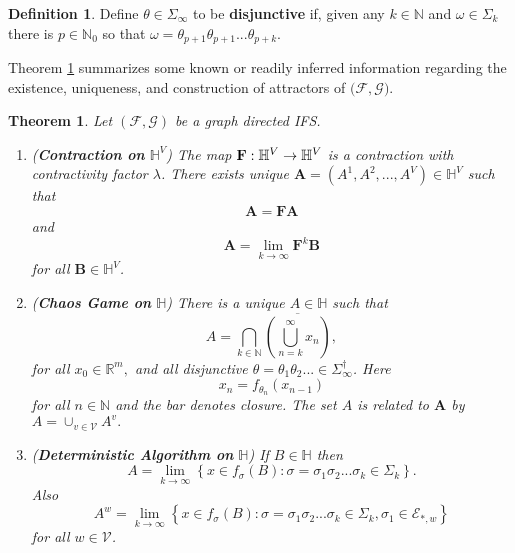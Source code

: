 \documentclass{amsproc}
\newtheorem{theorem}{Theorem}
\theoremstyle{plain}
\theoremstyle{definition}
\newtheorem{definition}{Definition}
\numberwithin{equation}{section}
\begin{document}
\begin{definition}
Define $\theta\in\Sigma_{\infty}$ to be \textbf{disjunctive} if, given any $%
k\in\mathbb{N}$ and $\omega\in\Sigma_{k}$ there is $p\in\mathbb{N}_{0}$ so
that $\omega=\theta_{p+1}\theta_{p+1}...\theta_{p+k}$.
\end{definition}

Theorem \ref{thm:one} summarizes some known or readily inferred information
regarding the existence, uniqueness, and construction of attractors of $(%
\mathcal{F},\mathcal{G)}$.

\begin{theorem}
\label{thm:one} Let $\left( \mathcal{F},\mathcal{G}\right) $ be a graph
directed IFS.

\begin{enumerate}
\item (\textbf{Contraction on} $\mathbb{H}^{V}$) The map $\mathbf{F}:\mathbb{%
H}^{V}\rightarrow\mathbb{H}^{V}$ is a contraction with contractivity factor $%
\lambda$. There exists unique $\mathbf{A}=(A^{1},A^{2},...,A^{V})\in\mathbb{H%
}^{V}$ such that 
\begin{equation*}
\mathbf{A=FA}
\end{equation*}
and 
\begin{equation*}
\mathbf{A=}\lim_{k\rightarrow\infty}\mathbf{F}^{k}\mathbf{B}
\end{equation*}
for all $\mathbf{B}\in\mathbb{H}^{V}$.

\item (\textbf{Chaos Game on }$\mathbb{H}$) There is a unique $A\in\mathbb{H}$
such that
\[
A=\bigcap\limits_{k\in\mathbb{N}}\overline{(%
{\displaystyle\bigcup\limits_{n=k}^{\infty}}
x_{n})},
\]
for all $x_{0}\in\mathbb{R}^{m},$ and all disjunctive $\theta=\theta_{1}%
\theta_{2}...\in\Sigma_{\infty}^{\dag}$. Here
\[
x_{n}=f_{\theta_{n}}(x_{n-1})
\]
for all $n\in\mathbb{N}$ and the bar denotes closure. The set $A$ is related
to $\mathbf{A}$ by $A=\cup_{v\in\mathcal{V}}A^{v}.$



\item (\textbf{Deterministic Algorithm on }$\mathbb{H}$) If $B\in\mathbb{H}$
then 
\begin{equation*}
A=\lim_{k\rightarrow\infty}\left\{ x\in
f_{\sigma}(B):\sigma=\sigma_{1}\sigma_{2}...\sigma_{k}\in\Sigma_{k}\right\} .
\end{equation*}
Also 
\begin{equation*}
A^{w}=\lim_{k\rightarrow\infty}\left\{ x\in f_{\sigma}(B):\sigma=\sigma
_{1}\sigma_{2}...\sigma_{k}\in\Sigma_{k},\sigma_{1}\in\mathcal{E}_{\ast
,w}\right\}
\end{equation*}
for all $w\in\mathcal{V}$.
\end{enumerate}
\end{theorem}
\end{document}

